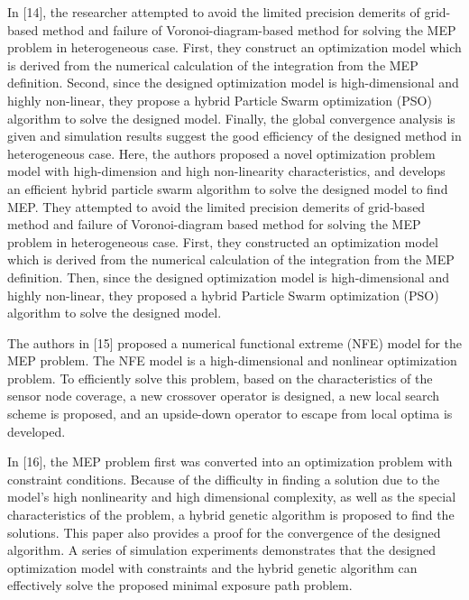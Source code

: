 \documentclass[final]{elsarticle}
\begin{document}
In [14], the researcher attempted to avoid the limited precision demerits of grid-based method and failure of Voronoi-diagram-based method for solving the MEP problem in heterogeneous case. First, they construct an optimization model which is derived from the numerical calculation of the integration from the MEP definition. Second, since the designed optimization model is high-dimensional and highly non-linear, they propose a hybrid Particle Swarm optimization (PSO) algorithm to solve the designed model. Finally, the global convergence analysis is given and simulation results suggest the good efficiency of the designed method in heterogeneous case. Here, the authors proposed a novel optimization problem model with high-dimension and high non-linearity characteristics, and develops an efficient hybrid particle swarm algorithm to solve the designed model to find MEP. They attempted to avoid the limited precision demerits of grid-based method and failure of Voronoi-diagram based method for solving the MEP problem in heterogeneous case. First, they constructed an optimization model which is derived from the numerical calculation of the integration from the MEP definition. Then, since the designed optimization model is high-dimensional and highly non-linear, they proposed a hybrid Particle Swarm optimization (PSO) algorithm to solve the designed model.

The authors in [15] proposed a numerical functional extreme (NFE) model for the MEP problem. The NFE model is a high-dimensional and nonlinear optimization problem. To efficiently solve this problem, based on the characteristics of the sensor node coverage, a new crossover operator is designed, a new local search scheme is proposed, and an upside-down operator to escape from local optima is developed.

In [16], the MEP problem first was converted into an optimization problem with constraint conditions. Because of the difficulty in finding a solution due to the model’s high nonlinearity and high dimensional complexity, as well as the special characteristics of the problem, a hybrid genetic algorithm is proposed to find the solutions. This paper also provides a proof for the convergence of the designed algorithm. A series of simulation experiments demonstrates that the designed optimization model with constraints and the hybrid genetic algorithm can effectively solve the proposed minimal exposure path problem.
\end{document}
